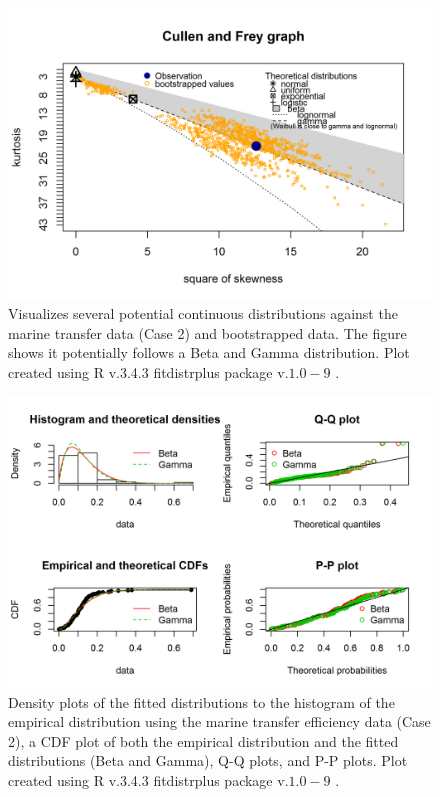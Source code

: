 \documentclass[oneside,12pt,final]{sty/ucthesis-CA2012}
\let\cite\citep                             %
\begin{document}
\begin{mainmatter}
\begin{figure}[H]
     \centering
       \includegraphics[width=.8\textwidth]{fig/cullen_frey_te}
    \caption{Visualizes several potential continuous distributions against the marine transfer data (Case 2) and bootstrapped data. The figure shows it potentially follows a Beta and Gamma distribution. Plot created using R v.3.4.3 \cite{Rcite} fitdistrplus package v.$1.0-9$ \cite{fitdistrplus}. }
    \label{cf_te_a2}
\end{figure}

\begin{figure}[H]
     \centering
       \includegraphics[width=.8\textwidth]{fig/gof_te}
    \caption{Density plots of the fitted distributions to the histogram of the empirical distribution using the marine transfer efficiency data (Case 2), a CDF plot of both the empirical distribution and the fitted distributions (Beta and Gamma), Q-Q plots, and P-P plots. Plot created using R v.3.4.3 \cite{Rcite} fitdistrplus package v.$1.0-9$ \cite{fitdistrplus}. }
    \label{gof_te_a2}
\end{figure}


\end{mainmatter}
\end{document}
